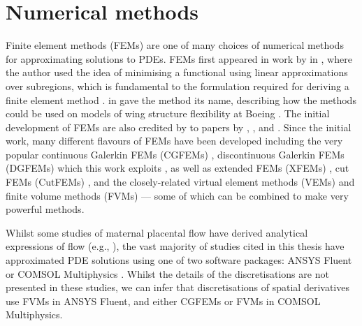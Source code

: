    \section{Numerical methods}
        Finite element methods (FEMs) are one of many choices of numerical methods for approximating solutions to PDEs. FEMs first appeared in work by \citeauthor{courantVariationalMethodsSolution1943} in \citeyear{courantVariationalMethodsSolution1943}, where the author used the idea of minimising a functional using linear approximations over subregions, which is fundamental to the formulation required for deriving a finite element method \cite{courantVariationalMethodsSolution1943}. \citeauthor{cloughFiniteElementMethod1960} in \citeyear{cloughFiniteElementMethod1960} gave the method its name, describing how the methods could be used on models of wing structure flexibility at Boeing \cite{cloughFiniteElementMethod1960}. The initial development of FEMs are also credited by \citeauthor{guptaBriefHistoryBeginning1996} \cite{guptaBriefHistoryBeginning1996} to papers by \citeauthor{argyrisEnergyTheoremsStructural1960} \cite{argyrisEnergyTheoremsStructural1960}, \citeauthor{turnerStiffnessDeflectionAnalysis1956} \cite{turnerStiffnessDeflectionAnalysis1956}, and \citeauthor{zienkiewiczFiniteElementMethod1989} \cite{zienkiewiczFiniteElementMethod1989}. Since the initial work, many different flavours of FEMs have been developed including the very popular continuous Galerkin FEMs (CGFEMs) \cite{ciarletFiniteElementMethod2002}, discontinuous Galerkin FEMs (DGFEMs) which this work exploits \cite{arnoldUnifiedAnalysisDiscontinuous2006}, as well as extended FEMs (XFEMs) \cite{Moes1999AFiniteelementMethodForCrackGrowth}, cut FEMs (CutFEMs) \cite{burmanCutFEMDiscretizingGeometry2015}, and the closely-related virtual element methods (VEMs) \cite{beiraodaveigaBasicPrinciplesVirtual2013} and finite volume methods (FVMs) \cite{moukalledFiniteVolumeMethod2016} --- some of which can be combined to make very powerful methods.

        Whilst some studies of maternal placental flow have derived analytical expressions of flow (e.g., \cite{chernyavskyMathematicalModelIntervillous2010,burtonRheologicalPhysiologicalConsequences2009}), the vast majority of studies cited in this thesis have approximated PDE solutions using one of two software packages: ANSYS Fluent \cite{meklerImpactTissuePorosity2022,saghianAssociationPlacentalJets2017} or COMSOL Multiphysics \cite{lecarpentierComputationalFluidDynamic2016,perazzoloModellingNutrientTransfer2016,perazzoloModellingEffectIntervillous2017}. Whilst the details of the discretisations are not presented in these studies, we can infer that discretisations of spatial derivatives use FVMs in ANSYS Fluent, and either CGFEMs or FVMs in COMSOL Multiphysics.

